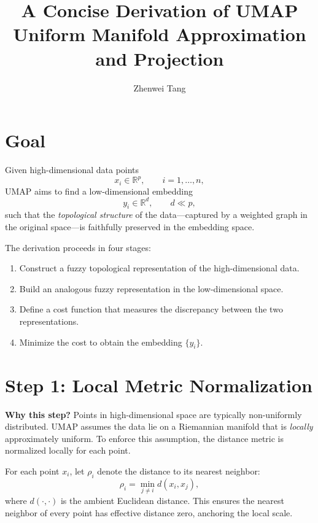 \documentclass[11pt]{article}
\begin{document}
\title{A Concise Derivation of UMAP\\
{\large Uniform Manifold Approximation and Projection}}
\author{Zhenwei Tang}
\date{}
\maketitle

\section*{Goal}

Given high-dimensional data points
\[
  x_i \in \mathbb{R}^p, \qquad i = 1, \dots, n,
\]
UMAP aims to find a low-dimensional embedding
\[
  y_i \in \mathbb{R}^d, \qquad d \ll p,
\]
such that the \emph{topological structure} of the data---captured by a weighted graph in the original space---is faithfully preserved in the embedding space.

The derivation proceeds in four stages:
\begin{enumerate}
  \item Construct a fuzzy topological representation of the high-dimensional data.
  \item Build an analogous fuzzy representation in the low-dimensional space.
  \item Define a cost function that measures the discrepancy between the two representations.
  \item Minimize the cost to obtain the embedding $\{y_i\}$.
\end{enumerate}

\section*{Step 1: Local Metric Normalization}

\textbf{Why this step?} Points in high-dimensional space are typically non-uniformly distributed. UMAP assumes the data lie on a Riemannian manifold that is \emph{locally} approximately uniform. To enforce this assumption, the distance metric is normalized locally for each point.

For each point $x_i$, let $\rho_i$ denote the distance to its nearest neighbor:
\[
  \rho_i = \min_{j \neq i} d(x_i, x_j),
\]
where $d(\cdot,\cdot)$ is the ambient Euclidean distance. This ensures the nearest neighbor of every point has effective distance zero, anchoring the local scale.
\end{document}
